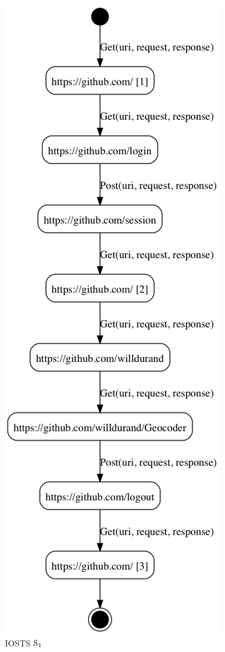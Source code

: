 \begin{figure}[ht]
    \begin{center}
        \includegraphics[width=1.0\linewidth]{figures/gh-iosts-1.png}
    \end{center}
    \caption{IOSTS $\EuScript{S}_1$}
    \label{fig:github:iosts:1}
\end{figure}

